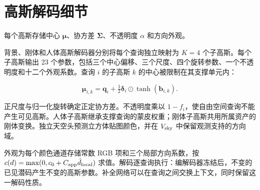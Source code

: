 \section{高斯解码细节}
\label{sec:supp-codec}

每个高斯存储中心 $\boldsymbol\mu$、协方差 $\boldsymbol\Sigma$、不透明度 $\alpha$ 和方向外观。

背景、刚体和人体高斯解码器分别将每个查询独立映射为 $K=4$ 个子高斯。每个子高斯输出 23 个参数，包括三个中心偏移、三个尺度、四个旋转参数、一个不透明度和十二个外观系数。查询 $i$ 的子高斯 $k$ 的中心被限制在其支撑单元内：

\begin{equation}
\boldsymbol\mu_{i,k}=\mathbf q_i+
\tfrac12\boldsymbol\delta_i\odot\tanh(\mathbf b_{i,k}).
\label{eq:child-center}
\end{equation}

正尺度与归一化旋转确定正定协方差。不透明度乘以 $1-f_i$，使自由空间查询不能产生可见高斯。人体子高斯继承支撑查询的蒙皮权重；刚体子高斯共用所属资产的刚体变换。独立天空头预测立方体贴图颜色，并在 $V_{\rm sky}$ 中保留观测支持的方向域。

外观为每个颜色通道存储常数 RGB 项和三个局部方向系数，按 $c(d)=\max(0,c_0+C_{\rm app}\hat d_{\rm local})$ 求值。解码逐查询执行：编解码器冻结后，不变的已见潜码产生不变的高斯参数。补全网络可以在查询之间交换上下文，同时保留这一解码性质。

